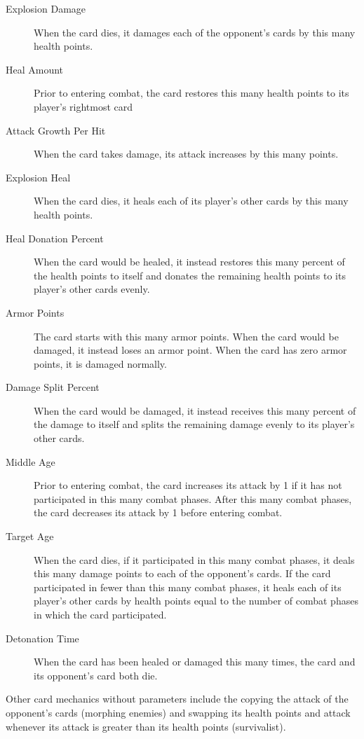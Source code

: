 \documentclass[letterpaper]{article} %
\begin{document}
\begin{description}
	\item[Explosion Damage] When the card dies, it damages
	each of the opponent's cards by this many health points.
	\item[Heal Amount] Prior to entering combat, the card 
	restores this many health points to its player's rightmost
	card
	\item[Attack Growth Per Hit] When the card takes damage, its
	attack increases by this many points.
	\item[Explosion Heal] When the card dies, it heals
	each of its player's other cards by this many health points.
	\item[Heal Donation Percent] When the card would be healed,
	it instead restores this many percent of the health points
	to itself and donates the remaining health points to its
	player's other cards evenly.
	\item[Armor Points] The card starts with this many armor points.
	When the card would be damaged, it instead loses an armor point.
	When the card has zero armor points, it is damaged normally.
	\item[Damage Split Percent] When the card would be damaged,
	it instead receives this many percent of the damage to itself
	and splits the remaining damage evenly to its player's other cards.
	\item[Middle Age] Prior to entering combat, the card increases its
	attack by 1 if it has not participated in this many combat phases.
	After this many combat phases, the card decreases its attack by 1
	before entering combat.
	\item[Target Age] When the card dies, if it participated in this many
	combat phases, it deals this many damage points to each of the opponent's
	cards. If the card participated in fewer than this many combat phases, 
	it heals each of its player's other cards by health points equal to the
	number of combat phases in which the card participated.
	\item[Detonation Time] When the card has been healed or damaged this
	many times, the card and its opponent's card both die.
\end{description}

Other card mechanics without parameters include the copying the 
attack of the opponent's cards (morphing enemies) and swapping 
its health points and attack whenever its attack is greater than its health 
points (survivalist).
\end{document}
